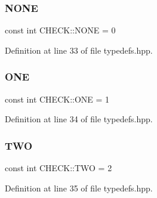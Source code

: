 \subsubsection{\texorpdfstring{N\+O\+NE}{NONE}}
{\footnotesize\ttfamily const int C\+H\+E\+C\+K\+::\+N\+O\+NE = 0}



Definition at line 33 of file typedefs.\+hpp.

\mbox{\label{namespace_c_h_e_c_k_acf8ecf93ddfb75456112712630f8f722}} 
\subsubsection{\texorpdfstring{O\+NE}{ONE}}
{\footnotesize\ttfamily const int C\+H\+E\+C\+K\+::\+O\+NE = 1}



Definition at line 34 of file typedefs.\+hpp.

\mbox{\label{namespace_c_h_e_c_k_a2b112aaec4c59311376a5a60f291aa48}} 
\subsubsection{\texorpdfstring{T\+WO}{TWO}}
{\footnotesize\ttfamily const int C\+H\+E\+C\+K\+::\+T\+WO = 2}



Definition at line 35 of file typedefs.\+hpp.

